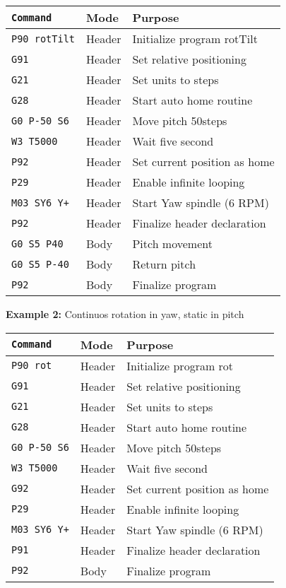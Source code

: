 \begin{tabular}{lll}
  \hline
  \texttt{Command}     & Mode   & Purpose                      \\
  \hline
  \texttt{P90 rotTilt} & Header & Initialize program rotTilt   \\
  \texttt{G91}         & Header & Set relative positioning     \\
  \texttt{G21}         & Header & Set units to steps           \\
  \texttt{G28}         & Header & Start auto home routine      \\
  \texttt{G0 P-50 S6}  & Header & Move pitch 50steps           \\
  \texttt{W3 T5000}    & Header & Wait five second             \\
  \texttt{P92}         & Header & Set current position as home \\
  \texttt{P29}         & Header & Enable infinite looping      \\
  \texttt{M03 SY6 Y+}  & Header & Start Yaw spindle (6 RPM)    \\
  \texttt{P92}         & Header & Finalize header declaration  \\
  \texttt{G0 S5 P40}   & Body   & Pitch movement               \\
  \texttt{G0 S5 P-40}  & Body   & Return pitch                 \\
  \texttt{P92}         & Body   & Finalize program             \\
  \hline
\end{tabular}


\vspace{0.3cm}
\noindent
\textbf{Example 2:} Continuos rotation in yaw, static in pitch


\begin{tabular}{lll}
  \hline
  \texttt{Command}    & Mode   & Purpose                      \\
  \hline
  \texttt{P90 rot}    & Header & Initialize program rot       \\
  \texttt{G91}        & Header & Set relative positioning     \\
  \texttt{G21}        & Header & Set units to steps           \\
  \texttt{G28}        & Header & Start auto home routine      \\
  \texttt{G0 P-50 S6} & Header & Move pitch 50steps           \\
  \texttt{W3 T5000}   & Header & Wait five second             \\
  \texttt{G92}        & Header & Set current position as home \\
  \texttt{P29}        & Header & Enable infinite looping      \\
  \texttt{M03 SY6 Y+} & Header & Start Yaw spindle (6 RPM)    \\
  \texttt{P91}        & Header & Finalize header declaration  \\
  \texttt{P92}        & Body   & Finalize program             \\
  \hline
\end{tabular}


